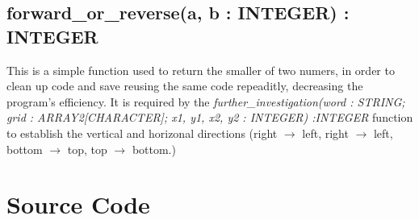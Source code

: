 \documentclass[a4paper,12pt]{article}
\begin{document}
\subsection{forward\_or\_reverse(a, b : INTEGER) : INTEGER}

\noindent This is a simple function used to return the smaller of two
numers, in order to clean up code and save reusing the same code
repeaditly, decreasing the program's efficiency. It is required by the
\emph{further\_investigation(word : STRING; grid : ARRAY2[CHARACTER];
x1, y1, x2, y2 : INTEGER) :INTEGER} function to establish the vertical
and horizonal directions (right $\to$ left, right $\to$ left, bottom
$\to$ top, top $\to$ bottom.)

\pagebreak

\section{Source Code}

\pagebreak
\end{document}
